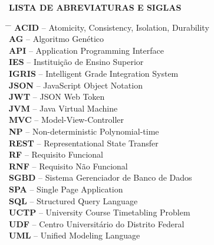 ﻿%
\newpage
\thispagestyle{empty}
\begin{center}
  {\bfseries LISTA DE ABREVIATURAS E SIGLAS}
\end{center}
\vspace{1cm}

\begin{tabbing}
  \hspace{3cm} \= \hspace{0.5cm} \= \kill  %
  \textbf{ACID}   \> -- \> Atomicity, Consistency, Isolation, Durability\\[0.15cm]
  \textbf{AG}     \> -- \> Algoritmo Genético\\[0.15cm]
  \textbf{API}    \> -- \> Application Programming Interface\\[0.15cm]
  \textbf{IES}    \> -- \> Instituição de Ensino Superior\\[0.15cm]
  \textbf{IGRIS}  \> -- \> Intelligent Grade Integration System\\[0.15cm]
  \textbf{JSON}   \> -- \> JavaScript Object Notation\\[0.15cm]
  \textbf{JWT}    \> -- \> JSON Web Token\\[0.15cm]
  \textbf{JVM}    \> -- \> Java Virtual Machine\\[0.15cm]
  \textbf{MVC}    \> -- \> Model-View-Controller\\[0.15cm]
  \textbf{NP}     \> -- \> Non-deterministic Polynomial-time\\[0.15cm]
  \textbf{REST}   \> -- \> Representational State Transfer\\[0.15cm]
  \textbf{RF}     \> -- \> Requisito Funcional\\[0.15cm]
  \textbf{RNF}    \> -- \> Requisito Não Funcional\\[0.15cm]
  \textbf{SGBD}   \> -- \> Sistema Gerenciador de Banco de Dados\\[0.15cm]
  \textbf{SPA}    \> -- \> Single Page Application\\[0.15cm]
  \textbf{SQL}    \> -- \> Structured Query Language\\[0.15cm]
  \textbf{UCTP}   \> -- \> University Course Timetabling Problem\\[0.15cm]
  \textbf{UDF}    \> -- \> Centro Universitário do Distrito Federal\\[0.15cm]
  \textbf{UML}    \> -- \> Unified Modeling Language\\[0.15cm]
\end{tabbing}
